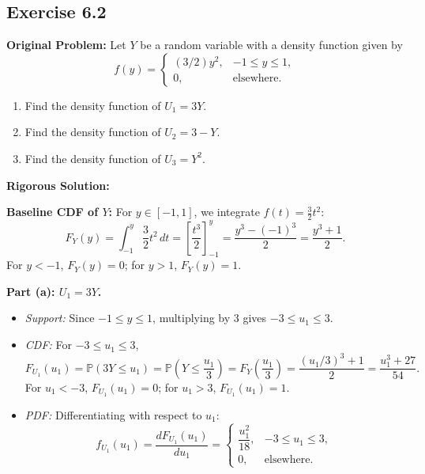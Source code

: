 \documentclass[11pt, letterpaper]{article}
\theoremstyle{definition}
\theoremstyle{remark}
\newcommand{\Prob}{\mathbb{P}}
\begin{document}
\subsection{Exercise 6.2}

\textbf{Original Problem:}
Let $Y$ be a random variable with a density function given by
\[
    f(y) = \begin{cases} (3/2)y^2, & -1 \le y \le 1, \\ 0, & \text{elsewhere.} \end{cases}
\]
\begin{enumerate}[label=\textbf{\alph*}]
    \item Find the density function of $U_1 = 3Y$.
    \item Find the density function of $U_2 = 3 - Y$.
    \item Find the density function of $U_3 = Y^2$.
\end{enumerate}

\hrulefill

\textbf{Rigorous Solution:}

\textbf{Baseline CDF of $Y$:} For $y \in [-1, 1]$, we integrate $f(t) = \frac{3}{2}t^2$:
\[
    F_Y(y) = \int_{-1}^{y} \frac{3}{2}t^2\,dt = \left[ \frac{t^3}{2} \right]_{-1}^{y} = \frac{y^3 - (-1)^3}{2} = \frac{y^3 + 1}{2}.
\]
For $y < -1$, $F_Y(y) = 0$; for $y > 1$, $F_Y(y) = 1$.

\textbf{Part (a): $U_1 = 3Y$.}
\begin{itemize}
    \item \textit{Support:} Since $-1 \le y \le 1$, multiplying by $3$ gives $-3 \le u_1 \le 3$.
    \item \textit{CDF:} For $-3 \le u_1 \le 3$,
    \[
        F_{U_1}(u_1) = \Prob(3Y \le u_1) = \Prob\left(Y \le \frac{u_1}{3}\right) = F_Y\left(\frac{u_1}{3}\right) = \frac{(u_1/3)^3 + 1}{2} = \frac{u_1^3 + 27}{54}.
    \]
    For $u_1 < -3$, $F_{U_1}(u_1) = 0$; for $u_1 > 3$, $F_{U_1}(u_1) = 1$.
    \item \textit{PDF:} Differentiating with respect to $u_1$:
    \[
        f_{U_1}(u_1) = \frac{dF_{U_1}(u_1)}{du_1} = \begin{cases} \dfrac{u_1^2}{18}, & -3 \le u_1 \le 3, \\[6pt] 0, & \text{elsewhere.} \end{cases}
    \]
\end{itemize}
\end{document}
